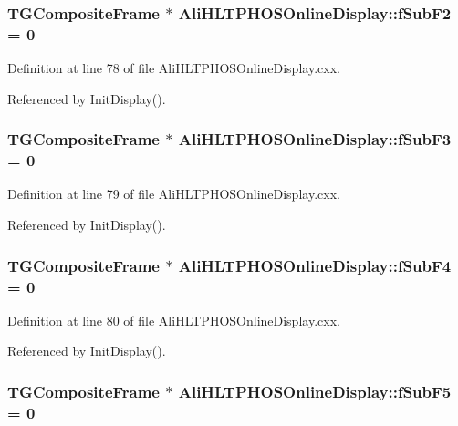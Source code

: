\subsubsection{\setlength{\rightskip}{0pt plus 5cm}TGComposite\-Frame $\ast$ {\bf Ali\-HLTPHOSOnline\-Display::f\-Sub\-F2} = 0\hspace{0.3cm}{\tt  [static, private]}}\label{classAliHLTPHOSOnlineDisplay_v7}




Definition at line 78 of file Ali\-HLTPHOSOnline\-Display.cxx.

Referenced by Init\-Display().
\subsubsection{\setlength{\rightskip}{0pt plus 5cm}TGComposite\-Frame $\ast$ {\bf Ali\-HLTPHOSOnline\-Display::f\-Sub\-F3} = 0\hspace{0.3cm}{\tt  [static, private]}}\label{classAliHLTPHOSOnlineDisplay_v8}




Definition at line 79 of file Ali\-HLTPHOSOnline\-Display.cxx.

Referenced by Init\-Display().
\subsubsection{\setlength{\rightskip}{0pt plus 5cm}TGComposite\-Frame $\ast$ {\bf Ali\-HLTPHOSOnline\-Display::f\-Sub\-F4} = 0\hspace{0.3cm}{\tt  [static, private]}}\label{classAliHLTPHOSOnlineDisplay_v9}




Definition at line 80 of file Ali\-HLTPHOSOnline\-Display.cxx.

Referenced by Init\-Display().
\subsubsection{\setlength{\rightskip}{0pt plus 5cm}TGComposite\-Frame $\ast$ {\bf Ali\-HLTPHOSOnline\-Display::f\-Sub\-F5} = 0\hspace{0.3cm}{\tt  [static, private]}}\label{classAliHLTPHOSOnlineDisplay_v10}




